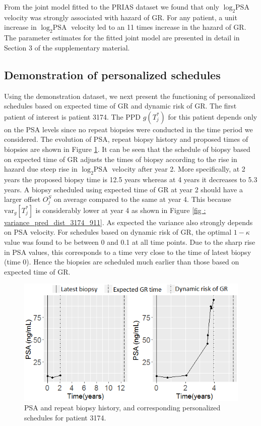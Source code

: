 From the joint model fitted to the PRIAS dataset we found that only $\log_2 \mbox{PSA}$ velocity was strongly associated with hazard of GR. For any patient, a unit increase in $\log_2 \mbox{PSA}$ velocity led to an 11 times increase in the hazard of GR. The parameter estimates for the fitted joint model are presented in detail in Section 3 of the supplementary material. 

\subsection{Demonstration of personalized schedules}
\label{subsec : demo_prias_pers_schedule}
Using the demonstration dataset, we next present the functioning of personalized schedules based on expected time of GR and dynamic risk of GR. The first patient of interest is patient 3174. The PPD $g(T^*_j)$ for this patient depends only on the PSA levels since no repeat biopsies were conducted in the time period we considered. The evolution of PSA, repeat biopsy history and proposed times of biopsies are shown in Figure \ref{fig : prias_demo_pid_3174}. It can be seen that the schedule of biopsy based on expected time of GR adjusts the times of biopsy according to the rise in hazard due steep rise in $\log_2 \mbox{PSA}$ velocity after year 2. More specifically, at 2 years the proposed biopsy time is 12.5 years whereas at 4 years it decreases to 5.3 years. A biopsy scheduled using expected time of GR at year 2 should have a larger offset $O^S_j$ on average compared to the same at year 4. This because $\mbox{var}_g[T^*_j]$ is considerably lower at year 4 as shown in Figure \ref{fig : variance_pred_dist_3174_911}. As expected the variance also strongly depends on PSA velocity. For schedules based on dynamic risk of GR, the optimal $1 - \kappa$ value was found to be between 0 and 0.1 at all time points. Due to the sharp rise in PSA values, this corresponds to a time very close to the time of latest biopsy (time 0). Hence the biopsies are scheduled much earlier than those based on expected time of GR. 

\begin{figure}
\centerline{\includegraphics[width=\columnwidth]{images/prias_demo/case_3174.png}}
\caption{PSA and repeat biopsy history, and corresponding personalized schedules for patient 3174.}
\label{fig : prias_demo_pid_3174}
\end{figure}


